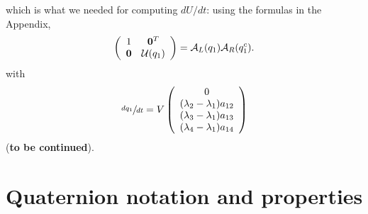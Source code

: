 \documentclass[9pt,lineno]{elife}
\begin{document}
which is what we needed for computing $dU/dt$: using the formulas in the Appendix,
\[ \left(
\begin{array}{cc}
1 & {\bf 0}^T \\
{\bf 0} & {\cal U}(q_1) 
\end{array}
\right)
= {\cal A}_L(q_1) {\cal A}_R(q_1^c). \]
with
\[\sfrac{dq_1}{dt} = V\left(
\begin{array}{c}
0 \\
(\lambda_2-\lambda_1)a_{12} \\
(\lambda_3-\lambda_1)a_{13}\\
(\lambda_4-\lambda_1)a_{14}
\end{array} \right)
\]
({\bf to be continued}).

\appendix
\def\thesection{Appendix \Alph{section}} 
\section{Quaternion notation and properties}
\label{sec:quaternions}
\end{document}
